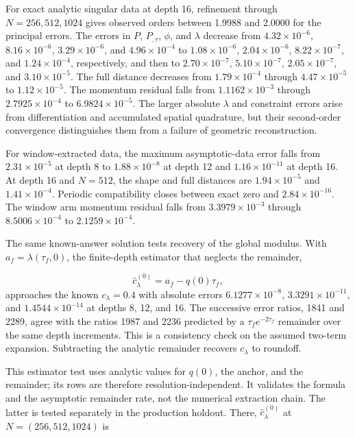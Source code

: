 \documentclass{iopjournal}
\begin{document}
For exact analytic singular data at depth 16, refinement through $N=256,512,1024$ gives observed orders between 1.9988 and 2.0000 for the principal errors. The errors in $P$, $P_{,\tau}$, $\phi$, and $\lambda$ decrease from $4.32\times10^{-6}$, $8.16\times10^{-6}$, $3.29\times10^{-6}$, and $4.96\times10^{-4}$ to $1.08\times10^{-6}$, $2.04\times10^{-6}$, $8.22\times10^{-7}$, and $1.24\times10^{-4}$, respectively, and then to $2.70\times10^{-7}$, $5.10\times10^{-7}$, $2.05\times10^{-7}$, and $3.10\times10^{-5}$. The full distance decreases from $1.79\times10^{-4}$ through $4.47\times10^{-5}$ to $1.12\times10^{-5}$. The momentum residual falls from $1.1162\times10^{-3}$ through $2.7925\times10^{-4}$ to $6.9824\times10^{-5}$. The larger absolute $\lambda$ and constraint errors arise from differentiation and accumulated spatial quadrature, but their second-order convergence distinguishes them from a failure of geometric reconstruction.

For window-extracted data, the maximum asymptotic-data error falls from $2.31\times10^{-5}$ at depth 8 to $1.88\times10^{-8}$ at depth 12 and $1.16\times10^{-11}$ at depth 16. At depth 16 and $N=512$, the shape and full distances are $1.94\times10^{-5}$ and $1.41\times10^{-4}$. Periodic compatibility closes between exact zero and $2.84\times10^{-16}$. The window arm momentum residual falls from $3.3979\times10^{-3}$ through $8.5006\times10^{-4}$ to $2.1259\times10^{-4}$.

The same known-answer solution tests recovery of the global modulus. With $a_f=\lambda(\tau_f,0)$, the finite-depth estimator that neglects the remainder,

\[
\widehat c_\lambda^{(0)}=a_f-q(0)\tau_f,
\]
approaches the known $c_\lambda=0.4$ with absolute errors $6.1277\times10^{-8}$, $3.3291\times10^{-11}$, and $1.4544\times10^{-14}$ at depths 8, 12, and 16. The successive error ratios, 1841 and 2289, agree with the ratios 1987 and 2236 predicted by a $\tau_f e^{-2\tau_f}$ remainder over the same depth increments. This is a consistency check on the assumed two-term expansion. Subtracting the analytic remainder recovers $c_\lambda$ to roundoff.

This estimator test uses analytic values for $q(0)$, the anchor, and the remainder; its rows are therefore resolution-independent. It validates the formula and the asymptotic remainder rate, not the numerical extraction chain. The latter is tested separately in the production holdout. There, $\widehat c_\lambda^{(0)}$ at $N=(256,512,1024)$ is
\end{document}
